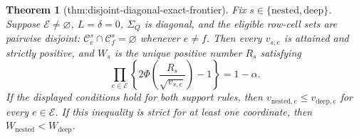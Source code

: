 \documentclass{article}
\newtheorem{theorem}{Theorem}
\begin{document}
\begin{theorem}[thm:disjoint-diagonal-exact-frontier]\label{thm:disjoint-diagonal-exact-frontier}
Fix \(s\in\{\mathrm{nested},\mathrm{deep}\}\).  Suppose
\(\mathcal E\ne\varnothing\), \(L=\delta=0\), \(\Sigma_Q\) is diagonal, and
the eligible row-cell sets are pairwise disjoint:
\(\mathcal C^s_e\cap\mathcal C^s_f=\varnothing\) whenever \(e\ne f\).
Then every \(v_{s,e}\) is attained and strictly positive, and \(W_s\) is the
unique positive number \(R_s\) satisfying
\[
 \prod_{e\in\mathcal E}
 \left\{2\Phi\!\left(\frac{R_s}{\sqrt{v_{s,e}}}\right)-1\right\}
 =1-\alpha. \tag{8}
\]
If the displayed conditions hold for both support rules, then
\(v_{\mathrm{nested},e}\leq v_{\mathrm{deep},e}\) for every
\(e\in\mathcal E\).  If this inequality is strict for at least one
coordinate, then \(W_{\mathrm{nested}}<W_{\mathrm{deep}}\).
\end{theorem}
\end{document}

